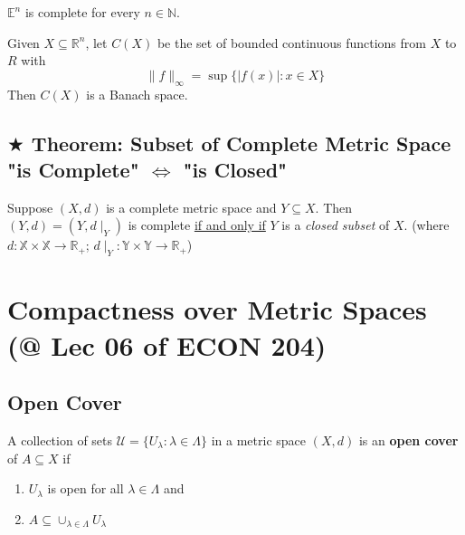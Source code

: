 \documentclass[11pt]{elegantbook}
\begin{document}
\begin{theorem}
    $\mathbb{E}^n$ is complete for every $n \in \mathbb{N}$.
\end{theorem}

\begin{theorem}
    Given $X \subseteq \mathbb{R}^n$, let $C(X)$ be the set of bounded continuous
    functions from $X$ to $R$ with $$\|f\|_\infty=\sup\{|f(x)|:x\in X\}$$
    Then $C(X)$ is a Banach space.
\end{theorem}

\subsection{$\bigstar$ Theorem: Subset of Complete Metric Space "is Complete" $\Leftrightarrow$ "is Closed"}
\begin{theorem}\label{complete_equal_closed}
    Suppose $(X, d)$ is a complete metric space and $Y \subseteq X$. Then $(Y, d) = (Y, d\mid_Y)$ is complete \underline{if and only if} $Y$ is a \textit{closed subset} of $X$. (where $d: \mathbb{X}\times \mathbb{X}\rightarrow \mathbb{R}_+$; $d\mid_Y: \mathbb{Y}\times \mathbb{Y}\rightarrow \mathbb{R}_+$)
\end{theorem}


\section{Compactness over Metric Spaces \small{(@ Lec 06 of ECON 204)}}
\subsection{Open Cover}
\begin{definition}
    \normalfont
    A collection of sets $\mathcal{U} = \{U_\lambda : \lambda \in \Lambda\}$ in a metric space $(X, d)$ is an \textbf{open cover} of $A\subseteq X$ if
    \begin{enumerate}
        \item $U_\lambda$ is open for all $\lambda \in \Lambda$ and
        \item $A\subseteq \cup_{\lambda\in\Lambda}U_\lambda$
    \end{enumerate}
\end{definition}
\end{document}
